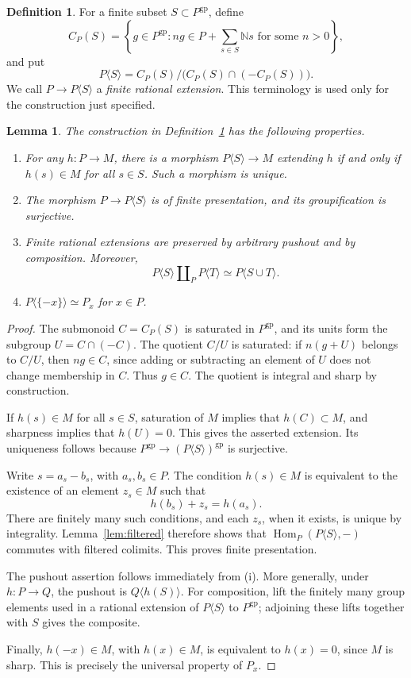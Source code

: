 \documentclass[11pt]{article}
\newtheorem{lemma}[theorem]{Lemma}
\theoremstyle{definition}
\newtheorem{definition}[theorem]{Definition}
\theoremstyle{remark}
\DeclareMathOperator{\Hom}{Hom}
\newcommand{\gp}{\mathrm{gp}}
\newcommand{\NN}{\mathbb N}
\begin{document}
\begin{definition}\label{def:rational}
For a finite subset \(S\subset P^{\gp}\), define
\[
C_P(S)=
\left\{g\in P^{\gp}:
ng\in P+\sum_{s\in S}\NN s
\text{ for some }n>0\right\},
\]
and put
\[
P\langle S\rangle=
C_P(S)/\bigl(C_P(S)\cap(-C_P(S))\bigr).
\]
We call \(P\to P\langle S\rangle\) a \emph{finite rational extension}.
This terminology is used only for the construction just specified.
\end{definition}

\begin{lemma}\label{lem:rational}
The construction in Definition~\ref{def:rational} has the following
properties.
\begin{enumerate}[label=\textup{(\roman*)}]
\item For any \(h:P\to M\), there is a morphism
\(P\langle S\rangle\to M\) extending \(h\) if and only if
\(h(s)\in M\) for all \(s\in S\). Such a morphism is unique.
\item The morphism \(P\to P\langle S\rangle\) is of finite
presentation, and its groupification is surjective.
\item Finite rational extensions are preserved by arbitrary
pushout and by composition. Moreover,
\[
P\langle S\rangle\amalg_P P\langle T\rangle
\simeq P\langle S\cup T\rangle.
\]
\item \(P\langle\{-x\}\rangle\simeq P_x\) for \(x\in P\).
\end{enumerate}
\end{lemma}

\begin{proof}
The submonoid \(C=C_P(S)\) is saturated in \(P^{\gp}\), and its units
form the subgroup \(U=C\cap(-C)\). The quotient \(C/U\) is saturated:
if \(n(g+U)\) belongs to \(C/U\), then \(ng\in C\), since adding or
subtracting an element of \(U\) does not change membership in \(C\).
Thus \(g\in C\). The quotient is integral and sharp by construction.

If \(h(s)\in M\) for all \(s\in S\), saturation of \(M\) implies that
\(h(C)\subset M\), and sharpness implies that \(h(U)=0\). This gives
the asserted extension. Its uniqueness follows because
\(P^{\gp}\to(P\langle S\rangle)^{\gp}\) is surjective.

Write \(s=a_s-b_s\), with \(a_s,b_s\in P\). The condition
\(h(s)\in M\) is equivalent to the existence of an element \(z_s\in M\)
such that
\[
h(b_s)+z_s=h(a_s).
\]
There are finitely many such conditions, and each \(z_s\), when it
exists, is unique by integrality. Lemma~\ref{lem:filtered} therefore
shows that
\(\Hom_P(P\langle S\rangle,-)\) commutes with filtered colimits.
This proves finite presentation.

The pushout assertion follows immediately from (i). More generally,
under \(h:P\to Q\), the pushout is
\(Q\langle h(S)\rangle\). For composition, lift the finitely many
group elements used in a rational extension of \(P\langle S\rangle\)
to \(P^{\gp}\); adjoining these lifts together with \(S\) gives the
composite.

Finally, \(h(-x)\in M\), with \(h(x)\in M\), is equivalent to
\(h(x)=0\), since \(M\) is sharp. This is precisely the universal
property of \(P_x\).
\end{proof}
\end{document}
